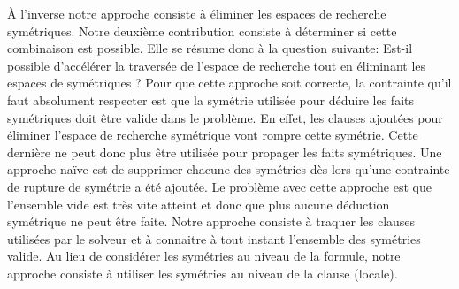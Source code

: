 À l'inverse notre approche consiste à éliminer les espaces de recherche 
symétriques. %
Notre deuxième contribution consiste à déterminer si cette combinaison est possible. Elle se résume donc à la question suivante:
Est-il possible d'accélérer la traversée de l'espace de recherche tout en éliminant les espaces de symétriques ?
Pour que cette approche soit correcte, la contrainte qu'il faut absolument respecter est que la symétrie utilisée pour déduire les faits symétriques doit être valide dans le problème. En effet, les clauses ajoutées pour éliminer l'espace de recherche
symétrique vont rompre cette symétrie. Cette dernière ne peut donc plus être utilisée pour propager les faits symétriques.
Une approche naïve est de supprimer chacune des symétries dès lors qu'une contrainte de rupture de symétrie a été ajoutée.
Le problème avec cette approche est que l'ensemble vide est très vite atteint et donc que plus aucune déduction symétrique ne peut être faite. Notre approche consiste à traquer les clauses utilisées par le solveur et à connaitre à tout instant l'ensemble des symétries valide. Au lieu de considérer les symétries au niveau de la formule,
notre approche consiste à utiliser les symétries au niveau de la clause (locale).

\vspace{2em}

\begin{table}[!htbp]\footnotesize
 \centering
 \caption{Comparaison du nombre de problèmes résolus par chaque approche.}
 \label{tab:satfr}
\end{table}%

